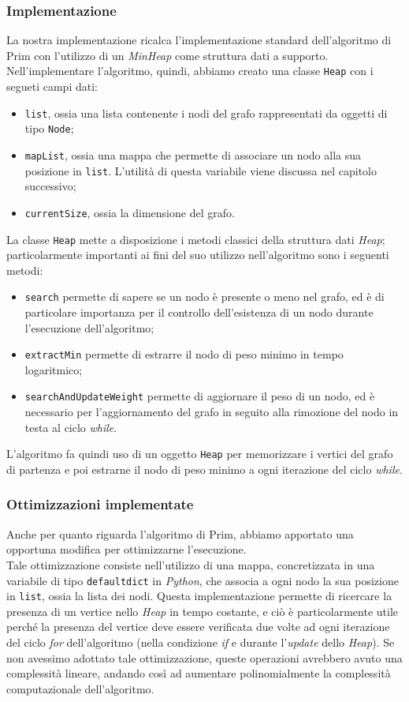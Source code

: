\subsubsection{Implementazione}
La nostra implementazione ricalca l'implementazione standard dell'algoritmo di Prim
con l'utilizzo di un \textit{MinHeap} come struttura dati a supporto. 
Nell'implementare l'algoritmo, quindi, abbiamo creato una classe \texttt{Heap} con i segueti campi dati:
\begin{itemize}
    \item \texttt{list}, ossia una lista contenente i nodi del grafo rappresentati da oggetti di tipo \texttt{Node};
    \item \texttt{mapList}, ossia una mappa che permette di associare un nodo alla sua posizione in \texttt{list}. L'utilità
    di questa variabile viene discussa nel capitolo successivo;
    \item \texttt{currentSize}, ossia la dimensione del grafo.
\end{itemize}
La classe \texttt{Heap} mette a disposizione i metodi classici della struttura dati \textit{Heap}; particolarmente importanti 
ai fini del suo utilizzo nell'algoritmo sono i seguenti metodi:
\begin{itemize}
    \item \texttt{search} permette di sapere se un nodo è presente o meno nel grafo, ed è di particolare importanza
    per il controllo dell'esistenza di un nodo durante l'esecuzione dell'algoritmo;
    \item \texttt{extractMin} permette di estrarre il nodo di peso minimo in tempo logaritmico;
    \item \texttt{searchAndUpdateWeight} permette di aggiornare il peso di un nodo, ed è necessario
    per l'aggiornamento del grafo in seguito alla rimozione del nodo in testa al ciclo \textit{while}.
\end{itemize}
L'algoritmo fa quindi uso di un oggetto \texttt{Heap} per memorizzare i vertici del grafo di partenza e poi estrarne il
nodo di peso minimo a ogni iterazione del ciclo \textit{while}.

\subsubsection{Ottimizzazioni implementate}

Anche per quanto riguarda l'algoritmo di Prim, abbiamo apportato una opportuna modifica per ottimizzarne l'esecuzione. \\
Tale ottimizzazione consiste nell'utilizzo di una mappa, concretizzata in una variabile di tipo
\texttt{defaultdict} in \textit{Python}, che associa a ogni nodo la sua posizione in \texttt{list}, ossia
la lista dei nodi. Questa implementazione permette di ricercare la presenza di un vertice nello \textit{Heap} in tempo costante,
e ciò è particolarmente utile perché la presenza del vertice deve essere verificata due volte ad ogni iterazione del ciclo \textit{for}
dell'algoritmo (nella condizione \textit{if} e durante l'\textit{update} dello \textit{Heap}).
Se non avessimo adottato tale ottimizzazione, queste operazioni avrebbero avuto una complessità lineare, andando così ad aumentare
polinomialmente la complessità computazionale dell'algoritmo.